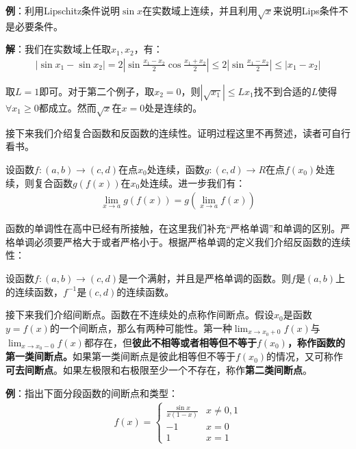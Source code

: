 \documentclass{ctexart}
\let\oldtextbf\textbf %
\renewcommand{\textbf}[1]{\textcolor{btex}{\oldtextbf{#1}}} %
\begin{document}
\textbf{\color{btex}例}：利用Lipschitz条件说明$\sin x$在实数域上连续，并且利用$\sqrt{x}$来说明Lips条件不是必要条件。

\textbf{\color{btex}解}：我们在实数域上任取$x_1,x_2$，有：
\begin{align*}
    |\sin x_1-\sin x_2|=2|\sin\frac{x_1-x_2}{2}\cos\frac{x_1+x_2}{2}|\leq 2|\sin\frac{x_1-x_2}{2}|\leq |x_1-x_2|
\end{align*}

取$L=1$即可。对于第二个例子，取$x_2=0$，则$|\sqrt{x_1}|\leq L x_1$找不到合适的$L$使得$\forall x_1\geq 0$都成立。然而$\sqrt{x}$在$x=0$处是连续的。

接下来我们介绍复合函数和反函数的连续性。证明过程这里不再赘述，读者可自行看书。
\begin{tcolorbox}[
    colback=bac2,     %
    colframe=fra2,   %
    coltitle=white,             %
    coltext=tex2,
    title=复合函数的连续性,
    fonttitle=\bfseries,        %
arc=3mm,                     %
breakable
]
设函数$f:(a,b)\to (c,d)$在点$x_0$处连续，函数$g:(c,d)\to R$在点$f(x_0)$处连续，则复合函数$g(f(x))$在$x_0$处连续。进一步我们有：
\begin{align*}
    \lim_{x\to a}g(f(x))=g(\lim_{x\to a}f(x))
\end{align*}
\end{tcolorbox}

函数的单调性在高中已经有所接触，在这里我们补充“严格单调”和单调的区别。严格单调必须要严格大于或者严格小于。根据严格单调的定义我们介绍反函数的连续性：
\begin{tcolorbox}[
    colback=bac2,     %
    colframe=fra2,   %
    coltitle=white,             %
    coltext=tex2,
    title=反函数的连续性,
    fonttitle=\bfseries,        %
arc=3mm,                     %
breakable
]
设函数$f: (a,b)\to (c,d)$是一个满射，并且是严格单调的函数。则$f$是$(a,b)$上的连续函数，$f^{-1}$是$(c,d)$的连续函数。
\end{tcolorbox}

接下来我们介绍间断点。函数在不连续处的点称作间断点。假设$x_0$是函数$y=f(x)$的一个间断点，那么有两种可能性。第一种$\lim_{x\to x_0+0}f(x)$与$\lim_{x\to x_0-0}f(x)$都存在，但\textbf{\color{btex}彼此不相等或者相等但不等于$f(x_0)$，称作函数的第一类间断点。}如果第一类间断点是彼此相等但不等于$f(x_0)$的情况，又可称作\textbf{\color{btex}可去间断点}。如果左极限和右极限至少一个不存在，称作\textbf{\color{btex}第二类间断点}。

\textbf{\color{btex}例}：指出下面分段函数的间断点和类型：
\begin{align*}
    f(x)=\begin{cases}
        \frac{\sin x}{x(1-x)}& x\neq 0,1\\
        -1&x=0\\
        1& x=1
    \end{cases}
\end{align*}
\end{document}
